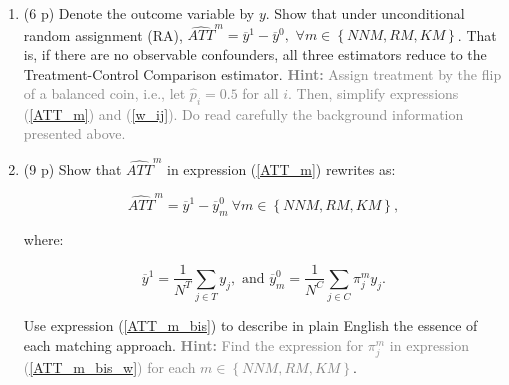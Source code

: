 \documentclass{article}
\begin{document}
\begin{enumerate}[label=\textbf{Q\arabic{enumi}}.,ref=Q\arabic{enumi}, wide=0pt, itemsep=0em, topsep=5pt, labelindent=0pt, resume]

\item (6 p) Denote the outcome variable by $y$. Show that under unconditional random assignment (RA), $\widehat{ATT}^{m}=\overline{y}^{1}-\overline{y}^{0},$ $\forall m\in \left\{ NNM,RM,KM\right\}$. That is, if there are no observable confounders, all three estimators reduce to the Treatment-Control Comparison estimator. \textcolor{gray}{\textbf{Hint:} Assign treatment by the flip of a balanced coin, i.e., let $\widehat{p}_{i}=0.5$ for all $i$. Then, simplify expressions (\ref{ATT_m}) and (\ref{w_ij}). Do read carefully the background information presented above.}

\item (9 p) Show that $\widehat{ATT}^{m}$ in expression (\ref{ATT_m}) rewrites as:

\begin{equation} \label{ATT_m_bis}
\widehat{ATT}^{m} =\overline{y}^{1}-\overline{y}_{m}^{0} \ \forall m\in \left\{ NNM,RM,KM\right\},
\end{equation}

\noindent where:

\begin{equation}\label{ATT_m_bis_w}
\overline{y}^{1} =\frac{1}{N^{T}}\sum_{j \in T}y_{j}, \text{     and      }  \overline{y}_{m}^{0} =\frac{1}{N^{C}}\sum_{j \in C}\pi_{j}^{m}y_{j}.
\end{equation}

\noindent Use expression (\ref{ATT_m_bis}) to describe in plain English the essence of each matching approach.  \textcolor{gray}{\textbf{Hint:} Find the expression for $\pi _{j}^{m}$ in expression (\ref{ATT_m_bis_w}) for each $m\in \left\{NNM,RM,KM\right\} $}.


\end{enumerate}
\end{document}
